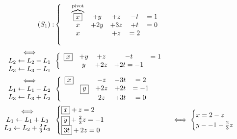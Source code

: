 \let\larr\leftarrow

\begin{exm}
	\begin{align*}
		(S_1): &\left\{\begin{array}{c c c c c}
			\quad \overbrace{\fbox{$x$}}^{\text{pivot}} &+ y &+ z &- t &= 1\\
			\quad x &+ 2y &+ 3z &+ t &= 0 \\
			\quad x &&+ z &= 2 \\
			\quad
		\end{array}\right.\\
		\begin{array}{c}
			\iff\\
			L_2 \leftarrow L_2 - L_1\\
			L_3 \leftarrow L_3 - L_1
		\end{array}
		&\left\{\begin{array}{c c c c c}
			\fbox{$x$} &+ y &+ z &- t &= 1\\
			&y &+2z &+2t = -1\\
		\end{array}\right.\\
		\begin{array}{c}
			\iff\\
			L_1 \leftarrow L_1 - L_2\\
			L_3 \leftarrow L_3 + L_2
		\end{array}
		&\left\{
		\begin{array}
			{c c c c c}
			\fbox{$x$} &&-z &-3t &=2\\
			& \fbox{$y$} &+2z &+2t &=-1\\
			&&2z &+3t &= 0\\
		\end{array}
		\right.\\
		\begin{array}{c}
			\iff\\
			L_1 \leftarrow L_1 + L_3\\
			L_2 \leftarrow L_2 + \frac{2}{3} L_3
		\end{array}
		&\begin{cases}
			\fbox{$x$} + z = 2\\
			\fbox{$y$} + \frac{2}{3}z = -1\\
			\fbox{$3t$} + 2z = 0\\
		\end{cases}
		&\iff \begin{cases}
			x = 2 - z\\
			y - -1 - \frac{2}{3}z\\

\end{cases}
\end{align*}
\end{exm}
